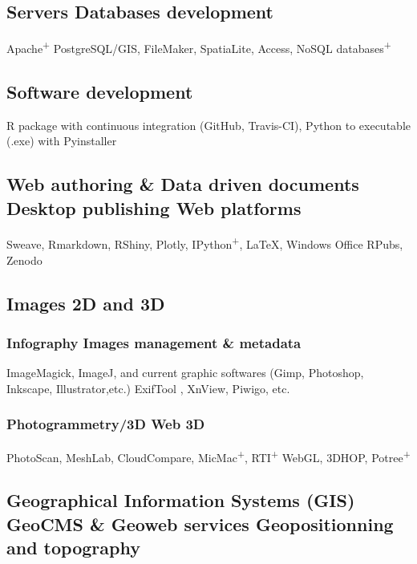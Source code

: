 \documentclass{article}
\begin{document}
\subsection*{Servers  {\textbar} Databases development} 

Apache\textsuperscript{+} \textbf{{\textbar}} PostgreSQL/GIS, FileMaker, SpatiaLite, Access, NoSQL databases\textsuperscript{+}

\subsection*{Software development} 

\textsf{R} package with continuous integration (GitHub, Travis-CI), \textsf{Python} to executable (.exe) with Pyinstaller

\subsection*{Web authoring \& Data driven documents {\textbar} Desktop publishing {\textbar} Web platforms}

\textsf{Sweave}, \textsf{Rmarkdown}, \textsf{RShiny}, \textsf{Plotly}, \textsf{IPython\textsuperscript{+}}, \textbf{{\textbar}}  \LaTeX, Windows Office \textbf{{\textbar}} RPubs, Zenodo

\subsection*{Images 2D and 3D}

\subsubsection*{Infography {\textbar} Images management \& metadata}

ImageMagick, ImageJ, and current graphic softwares (Gimp, Photoshop, Inkscape, Illustrator,etc.) {\textbar} ExifTool , XnView, Piwigo, etc.

\subsubsection*{Photogrammetry/3D {\textbar} Web 3D}

PhotoScan, MeshLab, CloudCompare, MicMac\textsuperscript{+}, RTI\textsuperscript{+} \textbf{{\textbar}} WebGL, 3DHOP, Potree\textsuperscript{+}

\subsection*{Geographical Information Systems (GIS) {\textbar} GeoCMS \& Geoweb services {\textbar} Geopositionning and topography}
\end{document}
